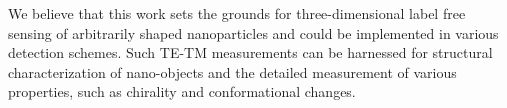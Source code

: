\documentclass[journal=jacsat,manuscript=article]{achemso}
\begin{document}
We believe that this work sets the grounds for three-dimensional label free sensing of arbitrarily shaped nanoparticles and could be implemented in various detection schemes. Such TE-TM measurements can be harnessed for structural characterization of nano-objects and the detailed measurement of various properties, such as chirality and conformational changes.

\begin{acknowledgement}



\end{acknowledgement}
\end{document}
